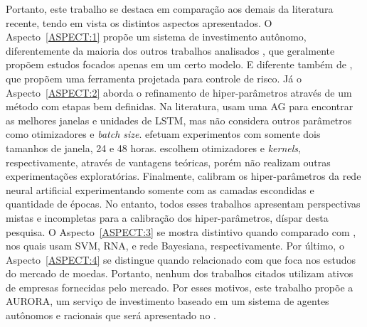 Portanto, este trabalho se destaca em comparação aos demais da literatura recente, tendo em vista os distintos aspectos apresentados. O Aspecto~\ref{ASPECT:1} propõe um sistema de investimento autônomo, diferentemente da maioria dos outros trabalhos analisados \cite{random_forest_macroeconomic, fusionportifolio, ga_optimized_lstm, forecasting_bayesian}, que geralmente propõem estudos focados apenas em um certo modelo. E diferente também de \textcite{airms}, que propõem uma ferramenta projetada para controle de risco. Já o Aspecto~\ref{ASPECT:2} aborda o refinamento de hiper-parâmetros através de um método com etapas bem definidas. Na literatura, \textcite{ga_optimized_lstm} usam uma \acrshort{AG} para encontrar as melhores janelas e unidades de LSTM, mas não considera outros parâmetros como otimizadores e \emph{batch size}. \textcite{forecasting_bayesian} efetuam experimentos com somente dois tamanhos de janela, 24 e 48 horas. \textcite{random_forest_macroeconomic, fusionportifolio} escolhem otimizadores e \emph{kernels}, respectivamente, através de vantagens teóricas, porém não realizam outras experimentações exploratórias. Finalmente, \textcite{airms} calibram os hiper-parâmetros da rede neural artificial experimentando somente com as camadas escondidas e quantidade de épocas. No entanto, todos esses trabalhos apresentam perspectivas mistas e incompletas para a calibração dos hiper-parâmetros, díspar desta pesquisa. O Aspecto~\ref{ASPECT:3} se mostra distintivo quando comparado com \cite{fusionportifolio, airms, forecasting_bayesian}, nos quais usam \acrshort{SVM}, \acrshort{RNA}, e rede Bayesiana, respectivamente. Por último, o Aspecto~\ref{ASPECT:4} se distingue quando relacionado com \textcite{forecasting_bayesian, ga_optimized_lstm, fusionportifolio} que foca nos estudos do mercado de moedas. Portanto, nenhum dos trabalhos citados utilizam ativos de empresas fornecidas pelo mercado. Por esses motivos, este trabalho propõe a AURORA, um serviço de investimento baseado em um sistema de agentes autônomos e racionais que será apresentado no .

